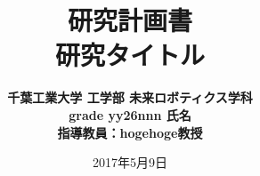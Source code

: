 \documentclass[uplatex,twocolumn]{jsarticle}
\begin{document}
\title{\normalsize 研究計画書\\ \LARGE \bf 研究タイトル}
\author{\bf 千葉工業大学 工学部 未来ロボティクス学科\\ grade yy26nnn 氏名\\ \small 指導教員：hogehoge教授}
\date{2017年5月9日}%
\maketitle






\end{document}
